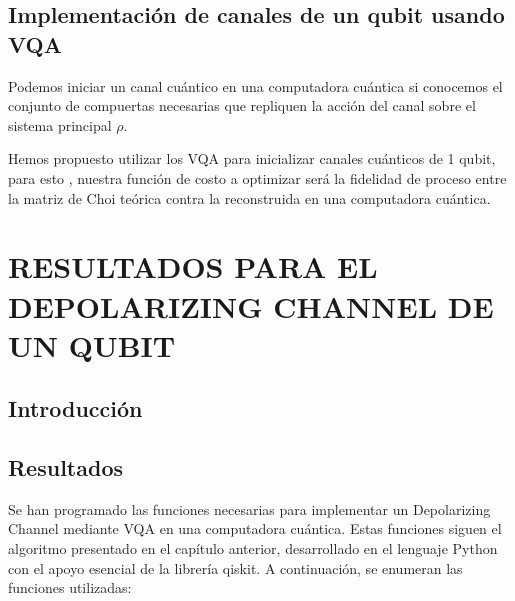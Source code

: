 \documentclass[letterpaper,12pt]{thesisECFM}
\theoremstyle{plain}
\theoremstyle{definition}
\theoremstyle{remark}
\newcommand{\1}{\mathbb{1}}
\begin{document}
\section{Implementación de canales de un qubit usando VQA}
Podemos iniciar un canal cuántico en una computadora cuántica si conocemos el conjunto de compuertas necesarias que repliquen la acción del canal sobre el sistema principal $\rho$. \par 

Hemos propuesto utilizar los VQA para inicializar canales cuánticos de 1 qubit, para esto , nuestra función de costo a optimizar será la fidelidad de proceso entre la matriz de Choi teórica contra la reconstruida en una computadora cuántica. \par 
 


\chapter{RESULTADOS PARA EL DEPOLARIZING CHANNEL DE UN QUBIT}
\section{Introducción}
\section{Resultados}
Se han programado las funciones necesarias para implementar un Depolarizing Channel mediante VQA en una computadora cuántica. Estas funciones siguen el algoritmo presentado en el capítulo anterior, desarrollado en el lenguaje Python con el apoyo esencial de la librería qiskit. A continuación, se enumeran las funciones utilizadas:
\end{document}

